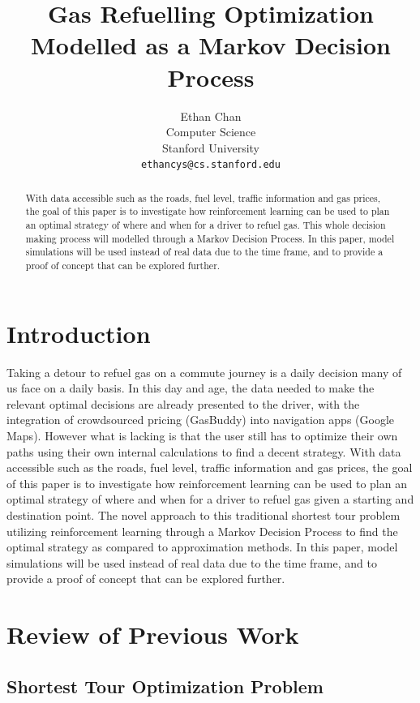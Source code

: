 \documentclass[10pt,twocolumn,letterpaper]{article}
\title{Gas Refuelling Optimization Modelled as a Markov Decision Process}
\author{
Ethan Chan\\
Computer Science\\
Stanford University\\
{\tt\small ethancys@cs.stanford.edu}
}
\begin{document}
\maketitle

\begin{abstract}
With data accessible such as the roads, fuel level, traffic information and gas prices, the goal of this paper is to investigate how reinforcement learning can be used to plan an optimal strategy of where and when for a driver to refuel gas. This whole decision making process will modelled through a Markov Decision Process. In this paper, model simulations will be used instead of real data due to the time frame, and to provide a proof of concept that can be explored further.
\end{abstract}

\section{Introduction}
Taking a detour to refuel gas on a commute journey is a daily decision many of us face on a daily basis. In this day and age, the data needed to make the relevant optimal decisions are already presented to the driver, with the integration of crowdsourced pricing (GasBuddy\cite{gasbuddy}) into navigation apps (Google Maps\cite{googlemaps}). However what is lacking is that the user still has to optimize their own paths using their own internal calculations to find a decent strategy. With data accessible such as the roads, fuel level, traffic information and gas prices, the goal of this paper is to investigate how reinforcement learning can be used to plan an optimal strategy of where and when for a driver to refuel gas given a starting and destination point. The novel approach to this traditional shortest tour problem utilizing reinforcement learning through a Markov Decision Process to find the optimal strategy as compared to approximation methods. In this paper, model simulations will be used instead of real data due to the time frame, and to provide a proof of concept that can be explored further.

\section{Review of Previous Work}

\subsection{Shortest Tour Optimization Problem}
\end{document}
